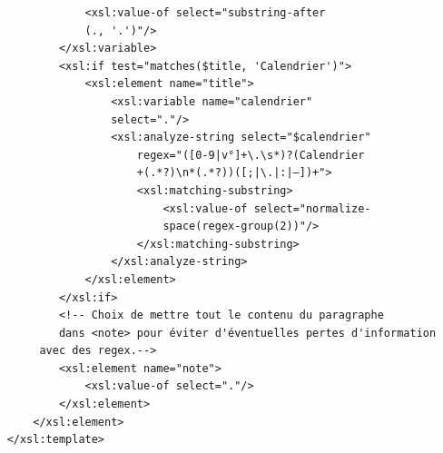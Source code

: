 \documentclass[a4paper,12pt,twoside]{book}
\begin{document}
\begin{verbatim}
                <xsl:value-of select="substring-after
                (., '.')"/>
            </xsl:variable>
            <xsl:if test="matches($title, 'Calendrier')">
                <xsl:element name="title">
                    <xsl:variable name="calendrier" 
                    select="."/>
                    <xsl:analyze-string select="$calendrier"
                        regex="([0-9|v°]+\.\s*)?(Calendrier
                        +(.*?)\n*(.*?))([;|\.|:|—])+">
                        <xsl:matching-substring>
                            <xsl:value-of select="normalize-
                            space(regex-group(2))"/>
                        </xsl:matching-substring>
                    </xsl:analyze-string>
                </xsl:element>
            </xsl:if>
            <!-- Choix de mettre tout le contenu du paragraphe
            dans <note> pour éviter d'éventuelles pertes d'information
         avec des regex.-->
            <xsl:element name="note">
                <xsl:value-of select="."/>
            </xsl:element>
        </xsl:element>
    </xsl:template>


\end{verbatim}
\end{document}
